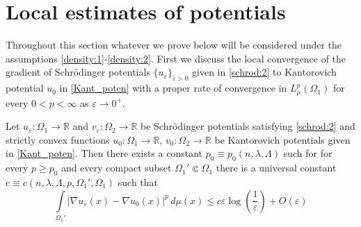 \documentclass[reqno,12pt]{article}
\newcommand{\R}{\mathbb{R}}
\newcommand{\I}{\int\limits}
\begin{document}


\section{Local estimates of potentials}\label{sec:loc_est}

Throughout this section whatever we prove below will be considered under the assumptions \eqref{density:1}-\eqref{density:2}.
First we discuss the local convergence of the gradient of Schr\"odinger potentials $\{u_{\varepsilon}\}_{\varepsilon>0}$ given in \eqref{schrod:2} to Kantorovich potential $u_{0}$ in \eqref{Kant_poten} with a proper rate of convergence in $L^{p}_{\mu}(\Omega_{1})$ for every $0<p<\infty$ as $\varepsilon\rightarrow 0^{+}$.

\begin{lemma}
    \label{lem:UE}
    Let $u_{\varepsilon} : \Omega_1\rightarrow \R$ and $v_{\varepsilon} : \Omega_2\rightarrow \R$ be Schr\"odinger potentials satisfying \eqref{schrod:2} and strictly convex functions $u_0 : \Omega_{1}\rightarrow \R$, $v_{0} : \Omega_{2}\rightarrow \R$ be Kantorovich potentials given in \eqref{Kant_poten}. Then there exists a constant $p_{0}\equiv p_{0}(n,\lambda,\Lambda)$ such for for every $p\geq p_{0}$ and every compact subset $\Omega_{1}'\Subset \Omega_{1}$ there is a universal constant $c \equiv c(n,\lambda,\Lambda,p,\Omega_{1}',\Omega_{1})$ such that 
    \begin{equation}
        \label{lem:UE:1}
        \I_{\Omega_{1}'} |\nabla u_{\varepsilon}(x)-\nabla u_{0}(x)|^{p}\,d\mu(x)
        \leqslant
        c\varepsilon\log\left( \frac{1}{\varepsilon} \right) + O(\varepsilon)
    \end{equation}
\end{lemma}
\end{document}
